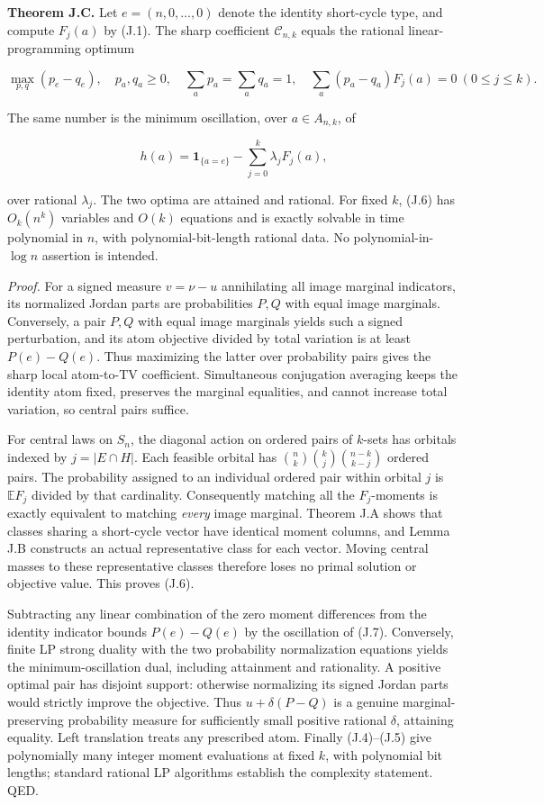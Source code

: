 \documentclass[
  11pt,
]{article}
\begin{document}
\textbf{Theorem J.C.} Let \(e=(n,0,\ldots,0)\) denote the identity
short-cycle type, and compute \(F_j(a)\) by (J.1). The sharp coefficient
\(\mathcal C_{n,k}\) equals the rational linear-programming optimum

\[
\max_{p,q}(p_e-q_e),
\quad
p_a,q_a\ge0,\quad
\sum_a p_a=\sum_a q_a=1,\quad
\sum_a(p_a-q_a)F_j(a)=0\ (0\le j\le k).
\tag{J.6}
\]

The same number is the minimum oscillation, over \(a\in A_{n,k}\), of

\[
h(a)=\mathbf1_{\{a=e\}}-\sum_{j=0}^k\lambda_jF_j(a),
\tag{J.7}
\]

over rational \(\lambda_j\). The two optima are attained and rational.
For fixed \(k\), (J.6) has \(O_k(n^k)\) variables and \(O(k)\) equations
and is exactly solvable in time polynomial in \(n\), with
polynomial-bit-length rational data. No polynomial-in-\(\log n\)
assertion is intended.

\emph{Proof.} For a signed measure \(v=\nu-u\) annihilating all image
marginal indicators, its normalized Jordan parts are probabilities
\(P,Q\) with equal image marginals. Conversely, a pair \(P,Q\) with
equal image marginals yields such a signed perturbation, and its atom
objective divided by total variation is at least \(P(e)-Q(e)\). Thus
maximizing the latter over probability pairs gives the sharp local
atom-to-TV coefficient. Simultaneous conjugation averaging keeps the
identity atom fixed, preserves the marginal equalities, and cannot
increase total variation, so central pairs suffice.

For central laws on \(S_n\), the diagonal action on ordered pairs of
\(k\)-sets has orbitals indexed by \(j=|E\cap H|\). Each feasible
orbital has \(\binom nk\binom kj\binom{n-k}{k-j}\) ordered pairs. The
probability assigned to an individual ordered pair within orbital \(j\)
is \(\mathbb E F_j\) divided by that cardinality. Consequently matching
all the \(F_j\)-moments is exactly equivalent to matching \emph{every}
image marginal. Theorem J.A shows that classes sharing a short-cycle
vector have identical moment columns, and Lemma J.B constructs an actual
representative class for each vector. Moving central masses to these
representative classes therefore loses no primal solution or objective
value. This proves (J.6).

Subtracting any linear combination of the zero moment differences from
the identity indicator bounds \(P(e)-Q(e)\) by the oscillation of (J.7).
Conversely, finite LP strong duality with the two probability
normalization equations yields the minimum-oscillation dual, including
attainment and rationality. A positive optimal pair has disjoint
support: otherwise normalizing its signed Jordan parts would strictly
improve the objective. Thus \(u+\delta(P-Q)\) is a genuine
marginal-preserving probability measure for sufficiently small positive
rational \(\delta\), attaining equality. Left translation treats any
prescribed atom. Finally (J.4)--(J.5) give polynomially many integer
moment evaluations at fixed \(k\), with polynomial bit lengths; standard
rational LP algorithms establish the complexity statement. QED.
\end{document}

